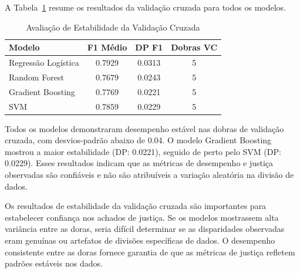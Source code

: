 A Tabela~\ref{tab:cross_validation} resume os resultados da validação 
cruzada para todos os modelos.

\begin{table}[H]
\centering
\caption{Avaliação de Estabilidade da Validação Cruzada}
\begin{tabular}{lccc}
\toprule
\textbf{Modelo} & \textbf{F1 Médio} & \textbf{DP F1} & \textbf{Dobras VC} \\
\midrule
Regressão Logística & 0.7929 & 0.0313 & 5 \\
Random Forest & 0.7679 & 0.0243 & 5 \\
Gradient Boosting & 0.7769 & 0.0221 & 5 \\
SVM & 0.7859 & 0.0229 & 5 \\
\bottomrule
\end{tabular}
\label{tab:cross_validation}
\end{table}

Todos os modelos demonstraram desempenho estável nas dobras de validação 
cruzada, com desvios-padrão abaixo de 0.04. O modelo Gradient Boosting 
mostrou a maior estabilidade (DP: 0.0221), seguido de perto pelo SVM 
(DP: 0.0229). Esses resultados indicam que as métricas de desempenho e 
justiça observadas são confiáveis e não são atribuíveis a variação 
aleatória na divisão de dados.

Os resultados de estabilidade da validação cruzada são importantes para 
estabelecer confiança nos achados de justiça. Se os modelos mostrassem 
alta variância entre as doras, seria difícil determinar se as disparidades 
observadas eram genuínas ou artefatos de divisões específicas de dados. 
O desempenho consistente entre as doras fornece garantia de que as 
métricas de justiça refletem padrões estáveis nos dados.
